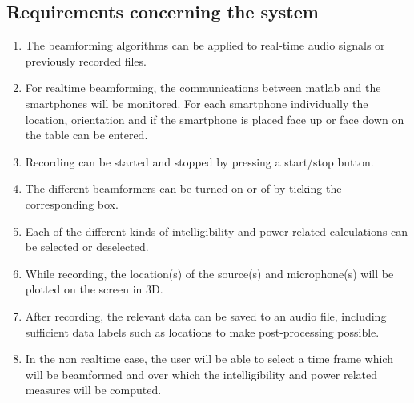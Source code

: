 \subsection{Requirements concerning the system}
\begin{enumerate}
\item The beamforming algorithms can be applied to real-time audio signals or previously recorded files.
\item For realtime beamforming, the communications between matlab and the smartphones will be monitored.
 For each smartphone individually the location, orientation and if the smartphone is placed face up or face down on the table can be entered.
\item Recording can be started and stopped by pressing a start/stop button.
\item The different beamformers can be turned on or of by ticking the corresponding box.
\item Each of the different kinds of intelligibility and power related calculations can be selected or deselected.
\item While recording, the location(s) of the source(s) and microphone(s) will be plotted on the screen in 3D.
\item After recording, the relevant data can be saved to an audio file, including sufficient data labels such as locations to make post-processing possible.
\item In the non realtime case, the user will be able to select a time frame which will be beamformed and over which the intelligibility and power related measures will be computed.
\end{enumerate}